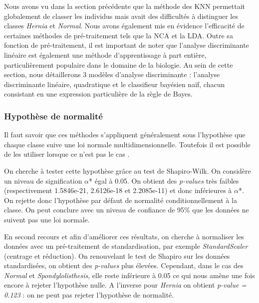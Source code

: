 \documentclass[twocolumn,10pt]{article}
\begin{document}
Nous avons vu dans la section précédente que la méthode des KNN permettait globalement de classer les individus mais avait des difficultés à distinguer les classes \textit{Hernia} et \textit{Normal}. Nous avons également mis en évidence l'efficacité de certaines méthodes de pré-traitement tels que la NCA et la LDA. Outre sa fonction de pré-traitement, il est important de noter que l'analyse discriminante linéaire est également une méthode d'apprentissage à part entière, particulièrement populaire dans le domaine de la biologie. Au sein de cette section, nous détaillerons 3 modèles d'analyse discriminante : l'analyse discriminante linéaire, quadratique et le classifieur bayésien naïf, chacun consistant en une expression particulière de la règle de Bayes.

\subsubsection{Hypothèse de normalité}

Il faut savoir que ces méthodes s'appliquent généralement sous l'hypothèse que chaque classe suive une loi normale multidimensionnelle. Toutefois il est possible de les utiliser lorsque ce n'est pas le cas \cite{Aide-mémoiredestatistiqueappliquéeàlabiologie}.

On cherche à tester cette hypothèse grâce au test de Shapiro-Wilk. On considère un niveau de signification $\alpha$* égal à 0.05.
On obtient des \textit{p-values} très faibles (respectivement 1.5846e-21, 2.6126e-18 et 2.2085e-11) et donc inférieures à $\alpha$*. On rejette donc l'hypothèse par défaut de normalité conditionnellement à la classe. On peut conclure avec un niveau de confiance de 95\% que les données ne suivent pas une loi normale.

En second recours et afin d'améliorer ces résultats, on cherche à normaliser les données avec un pré-traitement de standardisation, par exemple \textit{StandardScaler} (centrage et réduction). On renouvelant le test de Shapiro sur les données standardisées, on obtient des \textit{p-values} plus élevées. Cependant, dans le cas des \textit{Normal} et \textit{Spondylolisthesis}, elle reste inférieure à 0.05 ce qui nous amène une fois encore à rejeter l'hypothèse nulle. A l'inverse pour \textit{Hernia} on obtient \textit{p-value = 0.123} : on ne peut pas rejeter l'hypothèse de normalité.
\end{document}
